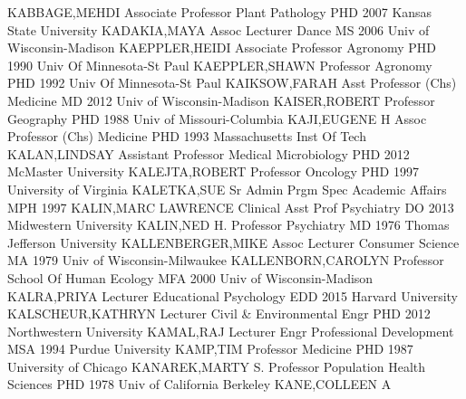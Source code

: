 \documentclass[
]{article}
\begin{document}
KABBAGE,MEHDI \textbar{}  \textbar Associate Professor
\textbar Plant Pathology \textbar PHD 2007 Kansas State University
\textbar KADAKIA,MAYA \textbar{}  \textbar Assoc Lecturer
\textbar Dance \textbar MS 2006 Univ of Wisconsin-Madison
\textbar KAEPPLER,HEIDI \textbar{}  \textbar Associate
Professor \textbar Agronomy \textbar PHD 1990 Univ Of Minnesota-St Paul
\textbar KAEPPLER,SHAWN \textbar{}  \textbar Professor
\textbar Agronomy \textbar PHD 1992 Univ Of Minnesota-St Paul
\textbar KAIKSOW,FARAH \textbar{}  \textbar Asst Professor
(Chs) \textbar Medicine \textbar MD 2012 Univ of Wisconsin-Madison
\textbar KAISER,ROBERT \textbar{}  \textbar Professor
\textbar Geography \textbar PHD 1988 Univ of Missouri-Columbia
\textbar KAJI,EUGENE H \textbar{}  \textbar Assoc Professor
(Chs) \textbar Medicine \textbar PHD 1993 Massachusetts Inst Of Tech
\textbar KALAN,LINDSAY \textbar{}  \textbar Assistant
Professor \textbar Medical Microbiology \textbar PHD 2012 McMaster
University \textbar KALEJTA,ROBERT \textbar{} 
\textbar Professor \textbar Oncology \textbar PHD 1997 University of
Virginia \textbar KALETKA,SUE \textbar{}  \textbar Sr Admin
Prgm Spec \textbar Academic Affairs \textbar MPH 1997
\textbar KALIN,MARC LAWRENCE \textbar{}  \textbar Clinical
Asst Prof \textbar Psychiatry \textbar DO 2013 Midwestern University
\textbar KALIN,NED H. \textbar{}  \textbar Professor
\textbar Psychiatry \textbar MD 1976 Thomas Jefferson University
\textbar KALLENBERGER,MIKE \textbar{}  \textbar Assoc
Lecturer \textbar Consumer Science \textbar MA 1979 Univ of
Wisconsin-Milwaukee \textbar KALLENBORN,CAROLYN \textbar{} 
\textbar Professor \textbar School Of Human Ecology \textbar MFA 2000
Univ of Wisconsin-Madison \textbar KALRA,PRIYA \textbar{} 
\textbar Lecturer \textbar Educational Psychology \textbar EDD 2015
Harvard University \textbar KALSCHEUR,KATHRYN \textbar{} 
\textbar Lecturer \textbar Civil \& Environmental Engr \textbar PHD 2012
Northwestern University \textbar KAMAL,RAJ \textbar{} 
\textbar Lecturer \textbar Engr Professional Development \textbar MSA
1994 Purdue University \textbar KAMP,TIM \textbar{} 
\textbar Professor \textbar Medicine \textbar PHD 1987 University of
Chicago \textbar KANAREK,MARTY S. \textbar{} 
\textbar Professor \textbar Population Health Sciences \textbar PHD 1978
Univ of California Berkeley \textbar KANE,COLLEEN A \textbar{}
\end{document}

